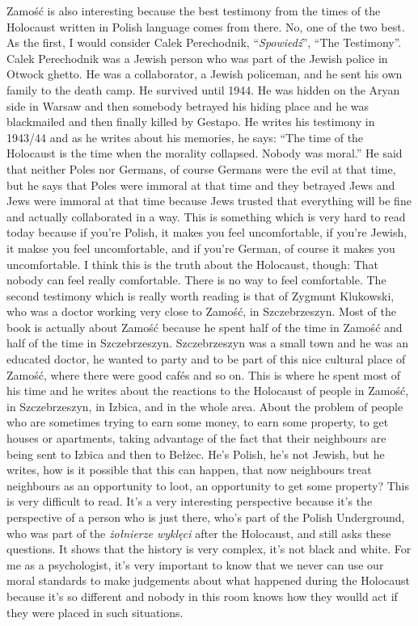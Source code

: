 Zamość is also interesting because the best testimony from the times of the Holocaust written in Polish language comes from there. No, one of the two best. As the first, I would consider Calek Perechodnik, ``\textit{Spowiedź}'', ``The Testimony''. Calek Perechodnik was a Jewish person who was part of the Jewish police in Otwock ghetto. He was a collaborator, a Jewish policeman, and he sent his own family to the death camp. He survived until 1944. He was hidden on the Aryan side in Warsaw and then somebody betrayed his hiding place and he was blackmailed and then finally killed by Gestapo. He writes his testimony in 1943/44 and as he writes about his memories, he says: ``The time of the Holocaust is the time when the morality collapsed. Nobody was moral.'' He said that neither Poles nor Germans, of course Germans were the evil at that time, but he says that Poles were immoral at that time and they betrayed Jews and Jews were immoral at that time because Jews trusted that everything will be fine and actually collaborated in a way. This is something which is very hard to read today because if you're Polish, it makes you feel uncomfortable, if you're Jewish, it makse you feel uncomfortable, and if you're German, of course it makes you uncomfortable. I think this is the truth about the Holocaust, though: That nobody can feel really comfortable. There is no way to feel comfortable. The second testimony which is really worth reading is that of Zygmunt Klukowski, who was a doctor working very close to Zamość, in Szczebrzeszyn. Most of the book is actually about Zamość because he spent half of the time in Zamość and half of the time in Szczebrzeszyn. Szczebrzeszyn was a small town and he was an educated doctor, he wanted to party and to be part of this nice cultural place of Zamość, where there were good cafés and so on. This is where he spent most of his time and he writes about the reactions to the Holocaust of people in Zamość, in Szczebrzeszyn, in Izbica, and in the whole area. About the problem of people who are sometimes trying to earn some money, to earn some property, to get houses or apartments, taking advantage of the fact that their neighbours are being sent to Izbica and then to Bełżec. He's Polish, he's not Jewish, but he writes, how is it possible that this can happen, that now neighbours treat neighbours as an opportunity to loot, an opportunity to get some property? This is very difficult to read. It's a very interesting perspective because it's the perspective of a person who is just there, who's part of the Polish Underground, who was part of the \textit{żołnierze wyklęci} after the Holocaust, and still asks these questions. It shows that the history is very complex, it’s not black and white. For me as a psychologist, it’s very important to know that we never can use our moral standards to make judgements about what happened during the Holocaust because it’s so different and nobody in this room knows how they woulld act if they were placed in such situations.

